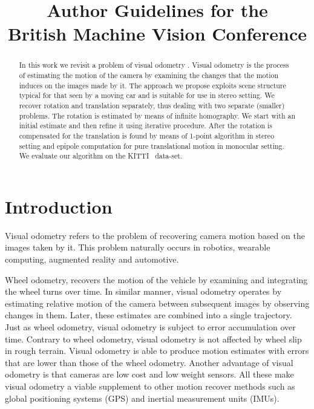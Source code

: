 \documentclass{bmvc2k}
\title{Author Guidelines for the\\ British Machine Vision Conference}
\begin{document}
\maketitle

\begin{abstract}
  In this work we revisit a problem of visual odometry . Visual
  odometry is the process of estimating the motion of the camera by
  examining the changes that the motion induces on the images made by
  it. The approach we propose exploits scene structure typical for
  that seen by a moving car and is suitable for use in stereo
  setting. We recover rotation and translation separately, thus
  dealing with two separate (smaller) problems. The rotation is
  estimated by means of infinite homography. We start with an initial
  estimate and then refine it using iterative procedure. After the
  rotation is compensated for the translation is found by means of
  1-point algorithm in stereo setting and epipole computation for pure
  translational motion in monocular setting. We evaluate our algorithm
  on the KITTI~\cite{geiger2013vision} data-set.
\end{abstract}

\section{Introduction}

Visual odometry refers to the problem of recovering camera motion
based on the images taken by it. This problem naturally occurs in
robotics, wearable computing, augmented reality and automotive.

Wheel odometry, recovers the motion of the vehicle by examining and
integrating the wheel turns over time.  In similar manner, visual
odometry operates by estimating relative motion of the camera between
subsequent images by observing changes in them. Later, these estimates
are combined into a single trajectory. Just as wheel odometry, visual
odometry is subject to error accumulation over time. Contrary to wheel
odometry, visual odometry is not affected by wheel slip in rough
terrain. Visual odometry is able to produce motion estimates with
errors that are lower than those of the wheel odometry. Another
advantage of visual odometry is that cameras are low cost and low
weight sensors.  All these make visual odometry a viable supplement to
other motion recover methods such as global positioning systems (GPS)
and inertial measurement units (IMUs).
\end{document}
